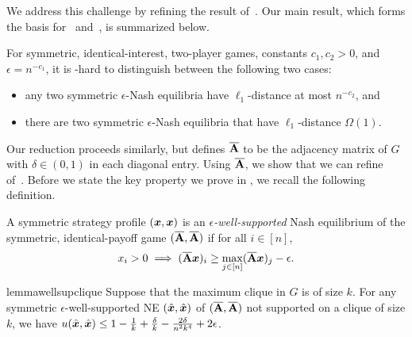 We address this challenge by refining the result of~\citet{MCLENNAN2010683}. Our main result, which forms the basis for~ and~, is summarized below.

\begin{theorem}
    \label{theorem:symmetric-new}
    For symmetric, identical-interest, two-player games, constants $c_1, c_2 > 0$, and $\epsilon = n^{-c_1}$, it is \NP-hard to distinguish between the following two cases:
    \begin{itemize}[noitemsep,topsep=0pt]
        \item any two symmetric $\epsilon$-Nash equilibria have $\ell_1$-distance at most $n^{-c_2}$, and
        \item there are two symmetric $\epsilon$-Nash equilibria that have $\ell_1$-distance $\Omega(1)$.
    \end{itemize}
\end{theorem}

Our reduction proceeds similarly, but defines $\overline{\mathbf{A}}$ to be the adjacency matrix of $G$ with $\delta \in (0, 1)$ in each diagonal entry. Using $\overline{\mathbf{A}}$, we show that we can refine~ of~\citet{MCLENNAN2010683}. Before we state the key property we prove in , we recall the following definition.

\begin{definition}
    A symmetric strategy profile $({\bm{x}}, {\bm{x}})$ is an \emph{$\epsilon$-well-supported} Nash equilibrium of the symmetric, identical-payoff game $(\overline{\mathbf{A}}, \overline{\mathbf{A}})$ if for all $i \in [n]$,
    \begin{align*}
        x_i > 0 \implies (\overline{\mathbf{A}} {\bm{x}})_i \geq \max_{j \in [n]} (\overline{\mathbf{A}} {\bm{x}})_j - \epsilon.
    \end{align*}
\end{definition}

\begin{restatable}{lemma}{wellsupclique}
\label{lemma:well_supported_nash_value}
    Suppose that the maximum clique in $G$ is of size $k$. For any symmetric $\epsilon$-well-supported NE $(\hat{{\bm{x}}}, \hat{{\bm{x}}})$ of $(\overline{\mathbf{A}}, \overline{\mathbf{A}})$ not supported on a clique of size $k$, we have $u(\hat{{\bm{x}}}, \hat{{\bm{x}}}) \leq 1 - \frac{1}{k} + \frac{\delta}{k} - \frac{2\delta}{ n^2k^4} + 2 \epsilon$.
\end{restatable}

